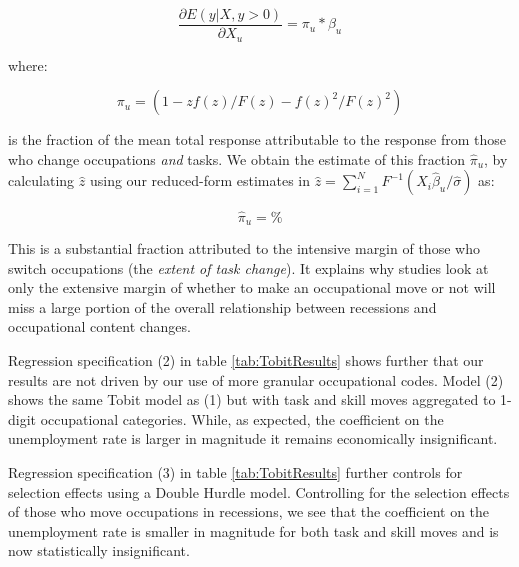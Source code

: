 \documentclass[11pt, oneside]{article}
\begin{document}
\begin{equation}
\frac{\partial E(y|X, y>0)}{\partial X_{u}}=\pi_{u}*\beta_{u}
\end{equation}

\noindent where:

\begin{equation*}
\label{eqn:fracMeanResponse}
\pi_{u} = (1- zf( z)/F( z) - f( z)^2/F( z)^2)
\end{equation*}

\noindent  is the fraction of the mean total response attributable to the response from those who change occupations \textit{and} tasks. We obtain the estimate of this fraction $\hat{\pi}_{u}$,  by calculating $\hat{z}$ using our reduced-form estimates in $\hat{z}= \sum_{i=1}^N F^{-1}(X_i \hat{\beta}_{u}/ \hat{\sigma})$ as:

\begin{equation*}
\label{eqn:fracMeanResponseequals}
\hat{\pi}_{u} =  \%
\end{equation*}

This is a substantial fraction attributed to the intensive margin of those who switch occupations (the \textit{extent of task change}). It explains why studies look at only the extensive margin of whether to make an occupational move or not will miss a large portion of the overall relationship between recessions and occupational content changes.

\vspace{2mm}

Regression specification (2) in table \ref{tab:TobitResults} shows further that our results are not driven by our use of more granular occupational codes. Model (2) shows the same Tobit model as (1) but with task and skill moves aggregated to 1-digit occupational categories. While, as expected, the coefficient on the unemployment rate is larger in magnitude it remains economically insignificant.

\vspace{2mm}

Regression specification (3) in table \ref{tab:TobitResults} further controls for selection effects using a Double Hurdle model. Controlling for the selection effects of those who move occupations in recessions, we see that the coefficient on the unemployment rate is smaller in magnitude for both task and skill moves and is now statistically insignificant.




\vspace{2mm}
\end{document}
